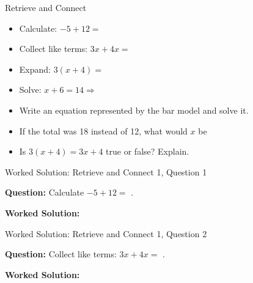 \documentclass{beamer}
\newcommand{\ablank}[1]{%
  \alt<2>{\textcolor{red}{#1}}{\underline{\phantom{#1}}}%
}
\newcommand{\ashow}[1]{\uncover<2->{\textcolor{red}{\small #1}}}
\newcommand{\ashowq}[1]{\alt<2->{\textcolor{red}{\small #1}}{?}}
\begin{document}
\begin{frame}{Retrieve and Connect}
\hypertarget{q-st1}{}

\begin{itemize}
  \item Calculate: $-5 + 12 =$ \ablank{$7$}
  \item Collect like terms: $3x + 4x =$ \ablank{$7x$}
  \item Expand: $3(x + 4) =$ \ablank{$3x+12$}
  \item Solve: $x + 6 = 14 \Rightarrow$ \ablank{$x=8$}
\end{itemize}

\vspace{0.3cm}

\begin{center}
\end{center}

\begin{itemize}
  \item Write an equation represented by the bar model and solve it. \ashow{$2x+4=12$, so $x=4$.}
  \item If the total was 18 instead of 12, what would $x$ be\ashowq{~$x=7$.}
  \item Is $3(x+4)=3x+4$ true or false? Explain. \ashow{False, because $3(x+4)=3x+12$.}
\end{itemize}

\end{frame}

\begin{frame}{Worked Solution: Retrieve and Connect 1, Question 1}
\hypertarget{work-st1}{}

\textbf{Question:} Calculate $-5+12=$\ablank{$7$}.

\textbf{Worked Solution:} \ashow{Start at $-5$ and move $12$ units to the right, landing on $7$.}

\end{frame}

\begin{frame}{Worked Solution: Retrieve and Connect 1, Question 2}

\textbf{Question:} Collect like terms: $3x+4x=$\ablank{$7x$}.

\textbf{Worked Solution:} \ashow{Add the coefficients: $3+4=7$, so $3x+4x=7x$.}

\end{frame}
\end{document}
